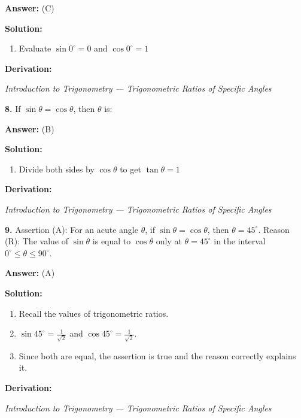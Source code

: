 \documentclass[12pt,a4paper]{exam}
\newcommand{\fitmath}[1]{%
  \sbox{\schmathbox}{$\displaystyle #1$}%
  \ifdim\wd\schmathbox>\linewidth
    \resizebox{\linewidth}{!}{\usebox{\schmathbox}}%
  \else
    \usebox{\schmathbox}%
  \fi}
\begin{document}
\begin{questions}
\textbf{Answer:}
(C)

\textbf{Solution:}
\begin{enumerate}
  \item Evaluate $\sin 0^\circ = 0$ and $\cos 0^\circ = 1$
\end{enumerate}
\textbf{Derivation:}
\begin{center}
\fitmath{0 + 1 = 1}
\end{center}
\hfill \textit{Introduction to Trigonometry — Trigonometric Ratios of Specific Angles}
\vspace{0.3cm}

\question \textbf{8.} If $\sin \theta = \cos \theta$, then $\theta$ is:

\textbf{Answer:}
(B)

\textbf{Solution:}
\begin{enumerate}
  \item Divide both sides by $\cos \theta$ to get $\tan \theta = 1$
\end{enumerate}
\textbf{Derivation:}
\begin{center}
\fitmath{\begin{aligned}
\sin \theta / \cos \theta = 1 \\
\implies \tan \theta = 1 \\
\implies \theta = 45^\circ
\end{aligned}}
\end{center}
\hfill \textit{Introduction to Trigonometry — Trigonometric Ratios of Specific Angles}
\vspace{0.3cm}

\question \textbf{9.} Assertion (A): For an acute angle $\theta$, if $\sin \theta = \cos \theta$, then $\theta = 45^\circ$. 
Reason (R): The value of $\sin \theta$ is equal to $\cos \theta$ only at $\theta = 45^\circ$ in the interval $0^\circ \le \theta \le 90^\circ$.

\textbf{Answer:}
(A)

\textbf{Solution:}
\begin{enumerate}
  \item Recall the values of trigonometric ratios.
  \item $\sin 45^\circ = \frac{1}{\sqrt{2}}$ and $\cos 45^\circ = \frac{1}{\sqrt{2}}$.
  \item Since both are equal, the assertion is true and the reason correctly explains it.
\end{enumerate}
\textbf{Derivation:}
\begin{center}
\fitmath{\begin{aligned}
\sin \theta = \cos \theta \\
\implies \frac{\sin \theta}{\cos \theta} = 1 \\
\implies \tan \theta = 1 \\
\implies \theta = 45^\circ
\end{aligned}}
\end{center}
\hfill \textit{Introduction to Trigonometry — Trigonometric Ratios of Specific Angles}
\vspace{0.3cm}


\end{questions}
\end{document}
